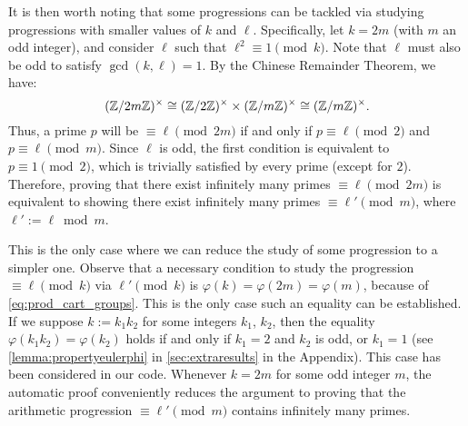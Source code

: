 \documentclass[../main.tex]{subfiles}
\begin{document}
It is then worth noting that some progressions can be tackled via studying progressions with smaller values of $k$ and $\ell$. Specifically, let $k=2m$ (with $m$ an odd integer), and consider $\ell$ such that $\ell^2\equiv 1\pmod{k}$. Note that $\ell$ must also be odd to satisfy $\gcd(k,\ell)=1$. By the Chinese Remainder Theorem, we have:
\begin{equation}\label{eq:prod_cart_groups}
	(\mathbb{Z}/2m\mathbb{Z})^\times\cong(\mathbb{Z}/2\mathbb{Z})^\times\times(\mathbb{Z}/m\mathbb{Z})^\times\cong (\mathbb{Z}/m\mathbb{Z})^\times.
\end{equation}
Thus, a prime $p$ will be $\equiv\ell\pmod{2m}$ if and only if $p\equiv\ell\pmod{2}$ and $p\equiv\ell\pmod{m}$. Since $\ell$ is odd, the first condition is equivalent to $p\equiv 1\pmod{2}$, which is trivially satisfied by every prime (except for $2$). Therefore, proving that there exist infinitely many primes $\equiv \ell\pmod{2m}$ is equivalent to showing there exist infinitely many primes $\equiv \ell'\pmod{m}$, where $\ell':=\ell\bmod{m}$.

 This is the only case where we can reduce the study of some progression to a simpler one. Observe that a necessary condition to study the progression $\equiv\ell\pmod{k}$ via $\ell'\pmod{k}$ is $\varphi(k)=\varphi(2m)=\varphi(m)$, because of \cref{eq:prod_cart_groups}. This is the only case such an equality can be established. If we suppose $k:=k_1k_2$ for some integers $k_1$, $k_2$, then the equality $\varphi(k_1k_2)=\varphi(k_2)$ holds if and only if $k_1=2$ and $k_2$ is odd, or $k_1=1$ (see \cref{lemma:propertyeulerphi} in \cref{sec:extraresults} in the Appendix). This case has been considered in our code. Whenever $k=2m$ for some odd integer $m$, the automatic proof conveniently reduces the argument to proving that the arithmetic progression $\equiv \ell'\pmod{m}$ contains infinitely many primes.
\end{document}

